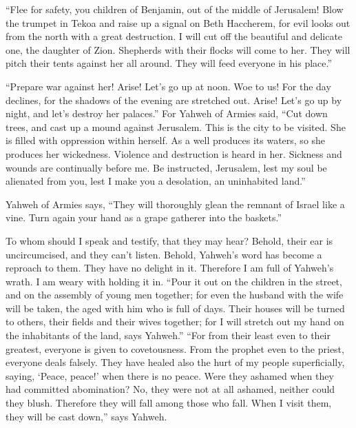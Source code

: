  ``Flee for safety, you children of Benjamin, out of the
middle of Jerusalem! Blow the trumpet in Tekoa and raise up a signal on
Beth Haccherem, for evil looks out from the north with a great
destruction.  I will cut off the beautiful and delicate
one, the daughter of Zion.  Shepherds with their flocks
will come to her. They will pitch their tents against her all around.
They will feed everyone in his place.''

 ``Prepare war against her! Arise! Let's go up at noon.
Woe to us! For the day declines, for the shadows of the evening are
stretched out.  Arise! Let's go up by night, and let's
destroy her palaces.''  For Yahweh of Armies said, ``Cut
down trees, and cast up a mound against Jerusalem. This is the city to
be visited. She is filled with oppression within herself. 
As a well produces its waters, so she produces her wickedness. Violence
and destruction is heard in her. Sickness and wounds are continually
before me.  Be instructed, Jerusalem, lest my soul be
alienated from you, lest I make you a desolation, an uninhabited land.''

 Yahweh of Armies says, ``They will thoroughly glean the
remnant of Israel like a vine. Turn again your hand as a grape gatherer
into the baskets.''

 To whom should I speak and testify, that they may hear?
Behold, their ear is uncircumcised, and they can't listen. Behold,
Yahweh's word has become a reproach to them. They have no delight in it.
 Therefore I am full of Yahweh's wrath. I am weary with
holding it in. ``Pour it out on the children in the street, and on the
assembly of young men together; for even the husband with the wife will
be taken, the aged with him who is full of days.  Their
houses will be turned to others, their fields and their wives together;
for I will stretch out my hand on the inhabitants of the land, says
Yahweh.''  ``For from their least even to their greatest,
everyone is given to covetousness. From the prophet even to the priest,
everyone deals falsely.  They have healed also the hurt
of my people superficially, saying, `Peace, peace!' when there is no
peace.  Were they ashamed when they had committed
abomination? No, they were not at all ashamed, neither could they blush.
Therefore they will fall among those who fall. When I visit them, they
will be cast down,'' says Yahweh.


